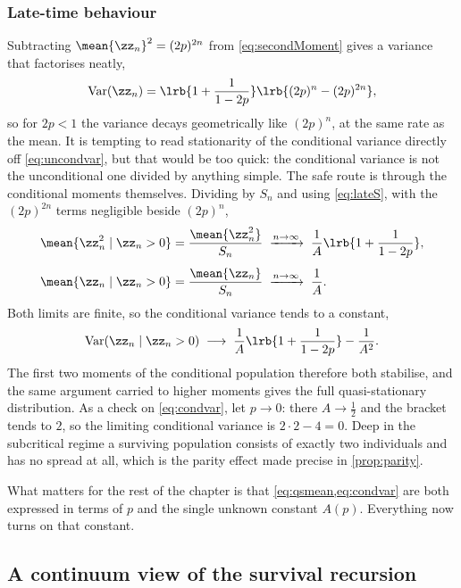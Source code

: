 \subsubsection{Late-time behaviour}

Subtracting $\mean{\zz_n}^2 = (2p)^{2n}$ from \cref{eq:secondMoment} gives a variance
that factorises neatly,
\begin{equation}
\label{eq:uncondvar}
\text{Var}(\zz_n) = \lrb{1+\frac{1}{1-2p}}\lrb{(2p)^n - (2p)^{2n}},
\end{equation}
so for $2p<1$ the variance decays geometrically like $(2p)^n$, at the same rate as the
mean. It is tempting to read stationarity of the conditional variance directly off
\cref{eq:uncondvar}, but that would be too quick: the conditional variance is not the
unconditional one divided by anything simple. The safe route is through the conditional
moments themselves. Dividing by $S_n$ and using \cref{eq:lateS}, with the $(2p)^{2n}$
terms negligible beside $(2p)^n$,
\begin{align*}
\mean{\zz_n^2\mid\zz_n>0} &= \frac{\mean{\zz_n^2}}{S_n}
\;\xrightarrow{n\to\infty}\;
\frac{1}{A}\lrb{1+\frac{1}{1-2p}},\\[4pt]
\mean{\zz_n\mid\zz_n>0} &= \frac{\mean{\zz_n}}{S_n}
\;\xrightarrow{n\to\infty}\;
\frac{1}{A} .
\end{align*}
Both limits are finite, so the conditional variance tends to a constant,
\begin{equation}
\label{eq:condvar}
\text{Var}(\zz_n\mid\zz_n>0)
\;\longrightarrow\;
\frac{1}{A}\lrb{1+\frac{1}{1-2p}} - \frac{1}{A^2} .
\end{equation}
The first two moments of the conditional population therefore both stabilise, and the
same argument carried to higher moments gives the full quasi-stationary distribution.
As a check on \cref{eq:condvar}, let $p\to0$: there $A\to\tfrac12$ and the bracket tends
to $2$, so the limiting conditional variance is $2\cdot2-4=0$. Deep in the subcritical
regime a surviving population consists of exactly two individuals and has no spread at
all, which is the parity effect made precise in \cref{prop:parity}.

What matters for the rest of the chapter is that \cref{eq:qsmean,eq:condvar} are both
expressed in terms of $p$ and the single unknown constant $A(p)$. Everything now turns
on that constant.

\subsection{A continuum view of the survival recursion}
\label{sec:riccati}

